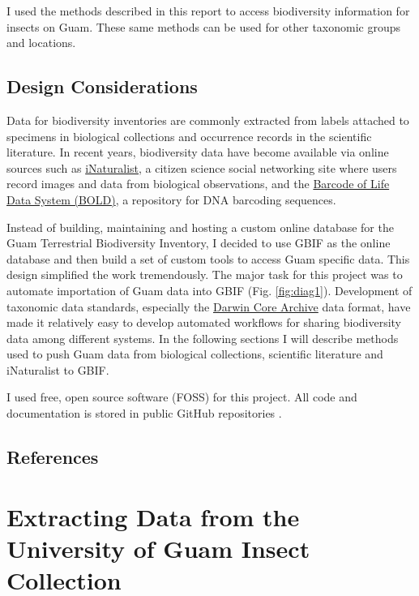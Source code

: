 \documentclass[12pt,letterpaper,english,bibliography=totocnumbered, abstract=on]{scrartcl}
\begin{document}
I used the methods described in this report to access biodiversity information for insects on Guam. These same methods can be used for other taxonomic groups and locations.

\subsection{Design Considerations}

Data for biodiversity inventories are commonly extracted from labels attached to specimens in biological collections and occurrence records in the scientific literature. In recent years, biodiversity data have become available via online sources such as \href{https://inaturalist.org}{iNaturalist}, a citizen science social networking site where users record images and data from biological observations, and the \href{https://v3.boldsystems.org/}{Barcode of Life Data System (BOLD)}, a repository for DNA barcoding sequences.

Instead of building, maintaining and hosting a custom online database for the Guam Terrestrial Biodiversity Inventory, I decided to use GBIF as the online database and then build a set of custom tools to access Guam specific data. This design simplified the work tremendously. The major task for this project was to automate importation of Guam data into GBIF (Fig. \ref{fig:diag1}). Development of taxonomic data standards, especially the \href{https://www.gbif.org/darwin-core}{Darwin Core Archive} data format, have made it relatively easy to develop automated workflows for sharing biodiversity data among different systems. In the following sections I will describe methods used to push Guam data from biological collections, scientific literature and iNaturalist to GBIF.

I used free, open source software (FOSS) for this project. All code and documentation is stored in public GitHub repositories \cite{gh-McIntire-Stennis,gh-datamining-insect-of-guam,gh-guam-insect-list}. 

\subsection{References}

\printbibliography[heading=none]





\pagebreak
\section{Extracting Data from the University of Guam Insect Collection}
\end{document}
